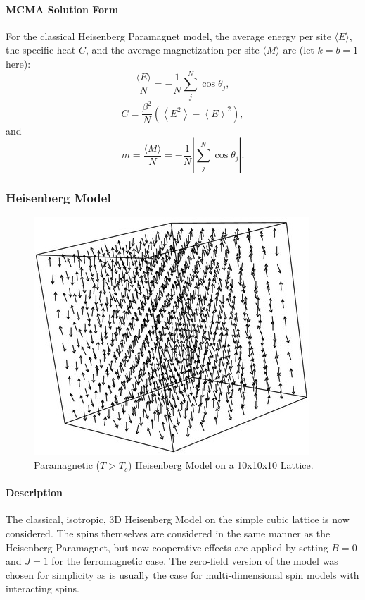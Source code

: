 \documentclass[a4paper,12pt]{article}
\begin{document}
		\paragraph{MCMA Solution Form}
		For the classical Heisenberg Paramagnet model, the average energy per site $\langle E \rangle$, the specific heat $C$, and the average magnetization per site $\langle M \rangle$ are (let $k = b = 1$ here):
		\begin{equation}\label{eq:heisenberg_PM_avg_energy}
			\frac{\langle E \rangle}{N} = -\frac{1}{N}\sum_j^N{\cos \theta_j},
		\end{equation}
		\begin{equation}\label{eq:heisenberg_PM_specific_heat}
			C = \frac{\beta^2}{N}(\left< E^2 \right> - \left< E \right>^2),
		\end{equation}
		and
		\begin{equation}\label{eq:heisenberg_PM_avg_magentization}
			m = \frac{\langle M \rangle}{N} = -\frac{1}{N}\left|\sum_j^N{\cos \theta_j}\right|.
		\end{equation}
		
	\subsubsection{Heisenberg Model}
			\begin{figure}[H]
			\centering
			\includegraphics[scale=0.5]{lattice}
			\caption{Paramagnetic ($T>T_c$) Heisenberg Model on a 10x10x10 Lattice.}
			\label{fig:heisenberg_lattice}
		\end{figure}
		\paragraph{Description}
The classical, isotropic, 3D Heisenberg Model on the simple cubic lattice is now considered. The spins themselves are considered in the same manner as the Heisenberg Paramagnet, but now cooperative effects are applied by setting $B = 0$ and $J = 1$ for the ferromagnetic case. The zero-field version of the model was chosen for simplicity as is usually the case for multi-dimensional spin models with interacting spins.	\cite{scribd}
\end{document}

